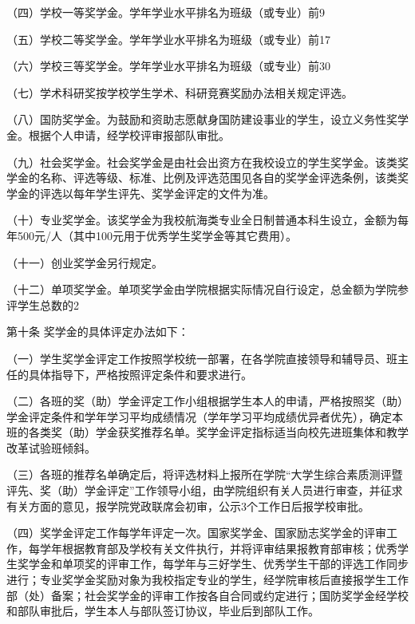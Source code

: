 \documentclass[UTF8,12pt,a4paper]{report}
\begin{document}
（四）学校一等奖学金。学年学业水平排名为班级（或专业）前9%

（五）学校二等奖学金。学年学业水平排名为班级（或专业）前17%

（六）学校三等奖学金。学年学业水平排名为班级（或专业）前30%

（七）学术科研奖按学校学生学术、科研竞赛奖励办法相关规定评选。

（八）国防奖学金。为鼓励和资助志愿献身国防建设事业的学生，设立义务性奖学金。根据个人申请，经学校评审报部队审批。

（九）社会奖学金。社会奖学金是由社会出资方在我校设立的学生奖学金。该类奖学金的名称、评选等级、标准、比例及评选范围见各自的奖学金评选条例，该类奖学金的评选以每年学生评先、奖学金评定的文件为准。

（十）专业奖学金。该奖学金为我校航海类专业全日制普通本科生设立，金额为每年500元/人（其中100元用于优秀学生奖学金等其它费用）。

（十一）创业奖学金另行规定。

（十二）单项奖学金。单项奖学金由学院根据实际情况自行设定，总金额为学院参评学生总数的2%

第十条  奖学金的具体评定办法如下：

（一）学生奖学金评定工作按照学校统一部署，在各学院直接领导和辅导员、班主任的具体指导下，严格按照评定条件和要求进行。

（二）各班的奖（助）学金评定工作小组根据学生本人的申请，严格按照奖（助）学金评定条件和学年学习平均成绩情况（学年学习平均成绩优异者优先），确定本班的各类奖（助）学金获奖推荐名单。奖学金评定指标适当向校先进班集体和教学改革试验班倾斜。

（三）各班的推荐名单确定后，将评选材料上报所在学院“大学生综合素质测评暨评先、奖（助）学金评定”工作领导小组，由学院组织有关人员进行审查，并征求有关方面的意见，报学院党政联席会初审，公示3个工作日后报学校审批。

（四）奖学金评定工作每学年评定一次。国家奖学金、国家励志奖学金的评审工作，每学年根据教育部及学校有关文件执行，并将评审结果报教育部审核；优秀学生奖学金和单项奖的评审工作，每学年与三好学生、优秀学生干部的评选工作同步进行；专业奖学金奖励对象为我校指定专业的学生，经学院审核后直接报学生工作部（处）备案；社会奖学金的评审工作按各自合同或约定进行；国防奖学金经学校和部队审批后，学生本人与部队签订协议，毕业后到部队工作。
\end{document}
